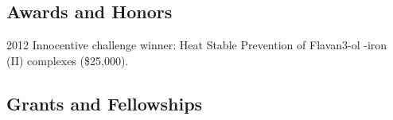 \documentclass[12pt,letterpaper]{report}
\begin{document}
    \subsection*{Awards and Honors}

    \begin{tablist}

    	\item[2012] \tab Innocentive challenge winner: Heat Stable Prevention of  Flavan3-ol -iron (II) complexes (\$25,000).

    \end{tablist}

    \subsection*{Grants and Fellowships}
\end{document}
